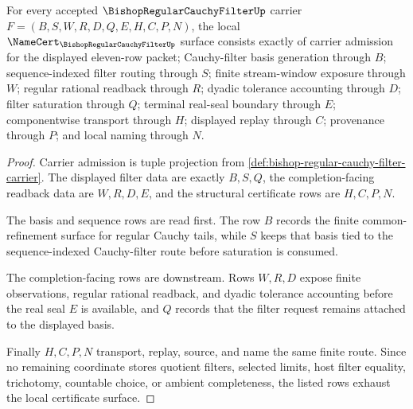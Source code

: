 \begin{theorem}
\label{thm:bishop-regular-cauchy-filter-namecert-obligations}
For every accepted $\BishopRegularCauchyFilterUp$ carrier $F=(B,S,W,R,D,Q,E,H,C,P,N)$, the local $\NameCert_{\BishopRegularCauchyFilterUp}$ surface consists exactly of carrier admission for the displayed eleven-row packet; Cauchy-filter basis generation through $B$; sequence-indexed filter routing through $S$; finite stream-window exposure through $W$; regular rational readback through $R$; dyadic tolerance accounting through $D$; filter saturation through $Q$; terminal real-seal boundary through $E$; componentwise transport through $H$; displayed replay through $C$; provenance through $P$; and local naming through $N$.
\end{theorem}
\begin{proof}
Carrier admission is tuple projection from \autoref{def:bishop-regular-cauchy-filter-carrier}. The displayed filter data are exactly $B,S,Q$, the completion-facing readback data are $W,R,D,E$, and the structural certificate rows are $H,C,P,N$.

The basis and sequence rows are read first. The row $B$ records the finite common-refinement surface for regular Cauchy tails, while $S$ keeps that basis tied to the sequence-indexed Cauchy-filter route before saturation is consumed.

The completion-facing rows are downstream. Rows $W,R,D$ expose finite observations, regular rational readback, and dyadic tolerance accounting before the real seal $E$ is available, and $Q$ records that the filter request remains attached to the displayed basis.

Finally $H,C,P,N$ transport, replay, source, and name the same finite route. Since no remaining coordinate stores quotient filters, selected limits, host filter equality, trichotomy, countable choice, or ambient completeness, the listed rows exhaust the local certificate surface.
\end{proof}

